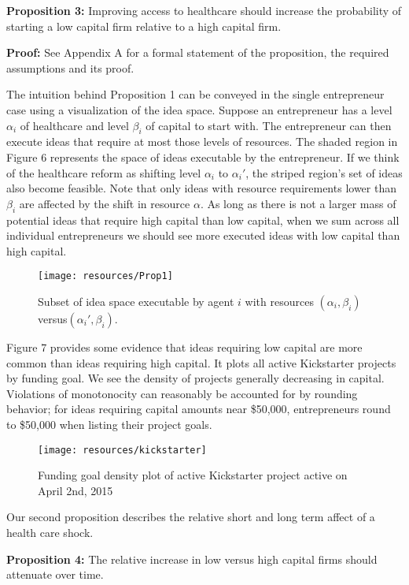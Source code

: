 \documentclass[12pt]{article}
\begin{document}
\textbf{Proposition 3:} 
Improving access to healthcare should increase the probability of starting a low capital firm relative to a high capital firm. 

\textbf{Proof:}
See Appendix A for a formal statement of the proposition, the required assumptions and its proof. 

The intuition behind Proposition 1 can be conveyed in the single entrepreneur case using a visualization of the idea space. Suppose an entrepreneur has a level $\alpha_i$ of healthcare and level $\beta_i$ of capital to start with. The entrepreneur can then execute ideas that require at most those levels of resources. The shaded region in Figure 6 represents the space of ideas executable by the entrepreneur. If we think of the healthcare reform as shifting level $\alpha_i$ to $\alpha_i'$, the striped region's set of ideas also become feasible. Note that only ideas with resource requirements lower than $\beta_i$ are affected by the shift in resource $\alpha$. As long as there is not a larger mass of potential ideas that require high capital than low capital, when we sum across all individual entrepreneurs we should see more executed ideas with low capital than high capital. 

\begin{figure}[H]
	\centering
	\texttt{[image: resources/Prop1]}
	\caption{Subset of idea space executable by agent $i$ with resources $(\alpha_i,\beta_i)$ versus$(\alpha_i', \beta_i)$.}
\end{figure}

Figure 7 provides some evidence that ideas requiring low capital are more common than ideas requiring high capital. It plots all active Kickstarter projects by funding goal. We see the density of projects generally decreasing in capital. Violations of monotonocity can reasonably be accounted for by rounding behavior; for ideas requiring capital amounts near \$50,000, entrepreneurs round to \$50,000 when listing their project goals. 

\begin{figure}[H]
	\centering
	\texttt{[image: resources/kickstarter]}
	\caption{Funding goal density plot of active Kickstarter project active on April 2nd, 2015 }
\end{figure}

Our second proposition describes the relative short and long term affect of a health care shock. 

\textbf{Proposition 4:} The relative increase in low versus high capital firms should attenuate over time. 
\end{document}
